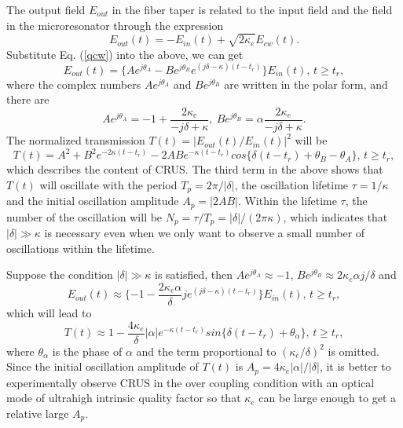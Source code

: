 \documentclass[aps,onecolumn,superscriptaddress,showpacs]{revtex4}
\begin{document}
The output field $E_{out}$ in the fiber taper is related to the input field and the field in the microresonator through the expression \cite{Righini2011}
\begin{equation}
E_{out}(t)=-E_{in}(t)+\sqrt{2\kappa_e}E_{cw}(t). \label{out}
\end{equation}
Substitute Eq. (\ref{qcw}) into the above, we can get
\begin{equation}
E_{out}(t)=\{Ae^{j \theta_A}-Be^{j \theta_B} e^{(j\delta-\kappa) (t-t_r)}\}E_{in}(t),\,t\geq t_r,
\end{equation}
where the complex numbers $Ae^{j \theta_A}$ and $Be^{j \theta_B}$ are written in the polar form, and there are
\begin{equation}
Ae^{j \theta_A}=-1+\frac{2\kappa_e}{-j\delta+\kappa},  \:
Be^{j \theta_B}=\alpha \frac{2\kappa_e}{-j\delta+\kappa}.
\end{equation}
The normalized transmission $T(t)=\left |E_{out}(t)/E_{in}(t)\right |^2 $ will be
\begin{equation}
T(t)=A^2+B^2e^{-2\kappa (t-t_r)}-2ABe^{-\kappa (t-t_r)}cos\{\delta (t-t_r)+\theta_B-\theta_A\}, \, t\geq t_r, \label{main}
\end{equation}
which describes the content of CRUS.
The third term in the above shows that  $T(t)$ will oscillate with the period $T_p=2\pi/|\delta|$, the oscillation lifetime $\tau=1/\kappa$ and the initial
oscillation amplitude $A_p=\left | 2AB \right |$. Within the lifetime $\tau$, the number of the oscillation will be $N_p=\tau /T_p=|\delta| /(2\pi \kappa)$,
which indicates that $|\delta| \gg \kappa$ is necessary even when we only want to observe a small number of oscillations within the lifetime.

Suppose the condition $|\delta| \gg \kappa$ is satisfied,
then $Ae^{j \theta_A}  \approx -1$, $Be^{j \theta_B}  \approx  2\kappa_e \alpha j/ \delta$ and
\begin{equation}
E_{out}(t)\approx \{-1- \frac{2\kappa_e \alpha}{ \delta} j e^{(j\delta-\kappa) (t-t_r)}\}E_{in}(t),\,t\geq t_r,
\end{equation}
which will lead to
\begin{equation}
T(t)\approx 1- \frac{4\kappa_e}{\delta} |\alpha|  e^{-\kappa (t-t_r)}sin\{\delta (t-t_r)+\theta_{\alpha}\},\, t\geq t_r, \label{tt}
\end{equation}
where $\theta_{\alpha}$ is the phase of $\alpha$ and the term  proportional to $(\kappa_e/\delta)^2$ is omitted. Since  the initial oscillation amplitude of $T(t)$ is $A_p=4\kappa_e |\alpha| /|\delta|$,
it is better to experimentally observe CRUS in the over coupling condition with an optical mode of ultrahigh intrinsic quality factor so that $\kappa_e$ can be large enough to get a relative large $A_p$.
\end{document}
